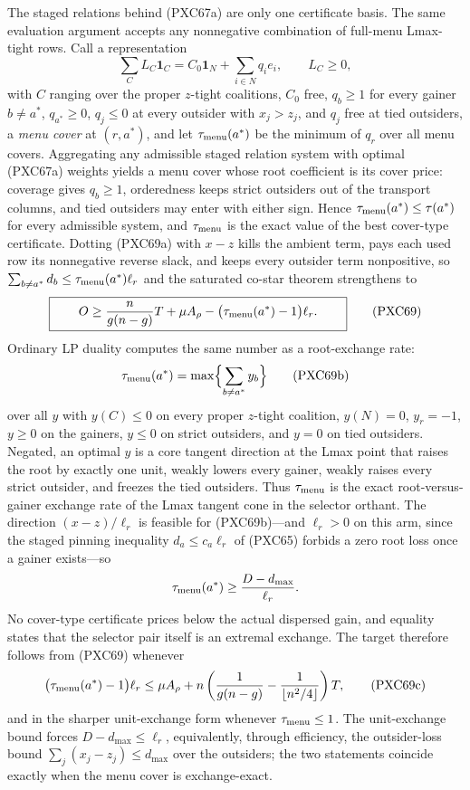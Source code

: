 \documentclass[11pt]{article}
\begin{document}
The staged relations behind (PXC67a) are only one certificate basis.  The
same evaluation argument accepts any nonnegative combination of full-menu
Lmax-tight rows.  Call a representation
\[
 \sum_C L_C\mathbf1_C=C_0\mathbf1_N+\sum_{i\in N}q_ie_i,
 \qquad L_C\ge0,                                     \tag{PXC69a}
\]
with $C$ ranging over the proper $z$-tight coalitions, $C_0$ free,
$q_b\ge1$ for every gainer $b\ne a^*$, $q_{a^*}\ge0$, $q_j\le0$ at every
outsider with $x_j>z_j$, and $q_j$ free at tied outsiders, a \emph{menu
cover} at $(r,a^*)$, and let $\tau_{\rm menu}(a^*)$ be the minimum of $q_r$
over all menu covers.  Aggregating any admissible staged relation system
with optimal (PXC67a) weights yields a menu cover whose root coefficient is
its cover price: coverage gives $q_b\ge1$, orderedness keeps strict
outsiders out of the transport columns, and tied outsiders may enter with
either sign.  Hence $\tau_{\rm menu}(a^*)\le\tau(a^*)$ for every admissible
system, and $\tau_{\rm menu}$ is the exact value of the best cover-type
certificate.  Dotting (PXC69a) with $x-z$ kills the ambient term, pays each
used row its nonnegative reverse slack, and keeps every outsider term
nonpositive, so $\sum_{b\ne a^*}d_b\le\tau_{\rm menu}(a^*)\ell_r$ and the
saturated co-star theorem strengthens to
\[
 \boxed{\qquad
 O\ge \frac{n}{g(n-g)}T+\mu A_\rho-
       \bigl(\tau_{\rm menu}(a^*)-1\bigr)\ell_r.
 \qquad}                                             \tag{PXC69}
\]
Ordinary LP duality computes the same number as a root-exchange rate:
\[
 \tau_{\rm menu}(a^*)=
 \max\Bigl\{\sum_{b\ne a^*}y_b\Bigr\}               \tag{PXC69b}
\]
over all $y$ with $y(C)\le0$ on every proper $z$-tight coalition,
$y(N)=0$, $y_r=-1$, $y\ge0$ on the gainers, $y\le0$ on strict outsiders,
and $y=0$ on tied outsiders.  Negated, an optimal $y$ is a core tangent
direction at the Lmax point that raises the root by exactly one unit,
weakly lowers every gainer, weakly raises every strict outsider, and
freezes the tied outsiders.  Thus $\tau_{\rm menu}$ is the exact
root-versus-gainer exchange rate of the Lmax tangent cone in the selector
orthant.  The direction $(x-z)/\ell_r$ is feasible for (PXC69b)---and
$\ell_r>0$ on this arm, since the staged pinning inequality
$d_a\le c_a\ell_r$ of (PXC65) forbids a zero root loss once a gainer
exists---so
\[
 \tau_{\rm menu}(a^*)\ge\frac{D-d_{\max}}{\ell_r}.
\]
No cover-type certificate prices below the actual dispersed gain, and
equality states that the selector pair itself is an extremal exchange.
The target therefore follows from (PXC69) whenever
\[
 \bigl(\tau_{\rm menu}(a^*)-1\bigr)\ell_r\le \mu A_\rho+
 n\left(\frac1{g(n-g)}-\frac1{\lfloor n^2/4\rfloor}\right)T,
                                                     \tag{PXC69c}
\]
and in the sharper unit-exchange form whenever $\tau_{\rm menu}\le1$.  The
unit-exchange bound forces $D-d_{\max}\le\ell_r$, equivalently, through
efficiency, the outsider-loss bound $\sum_j(x_j-z_j)\le d_{\max}$ over the
outsiders; the two statements coincide exactly when the menu cover is
exchange-exact.
\end{document}
